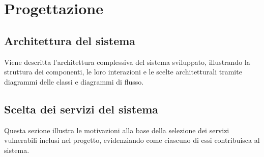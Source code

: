 \section{Progettazione}
\subsection{Architettura del sistema}
Viene descritta l'architettura complessiva del sistema sviluppato, illustrando la struttura dei componenti, le loro interazioni e le scelte architetturali tramite diagrammi delle classi e diagrammi di flusso.
\subsection{Scelta dei servizi del sistema}
Questa sezione illustra le motivazioni alla base della selezione dei servizi vulnerabili inclusi nel progetto, evidenziando come ciascuno di essi contribuisca al sistema.